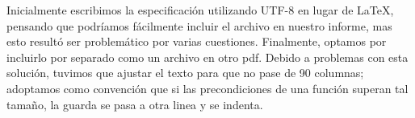 \documentclass[a4paper,titlepage]{article}
\begin{document}
Inicialmente escribimos la especificación utilizando UTF-8 en lugar de LaTeX, pensando que podríamos fácilmente incluir el archivo en nuestro informe, mas esto resultó ser problemático por varias cuestiones. Finalmente, optamos por incluirlo por separado como un archivo en otro pdf. Debido a problemas con esta solución, tuvimos que ajustar el texto para que no pase de 90 columnas; adoptamos como convención que si las precondiciones de una función superan tal tamaño, la guarda se pasa a otra linea y se indenta.


\end{document}
